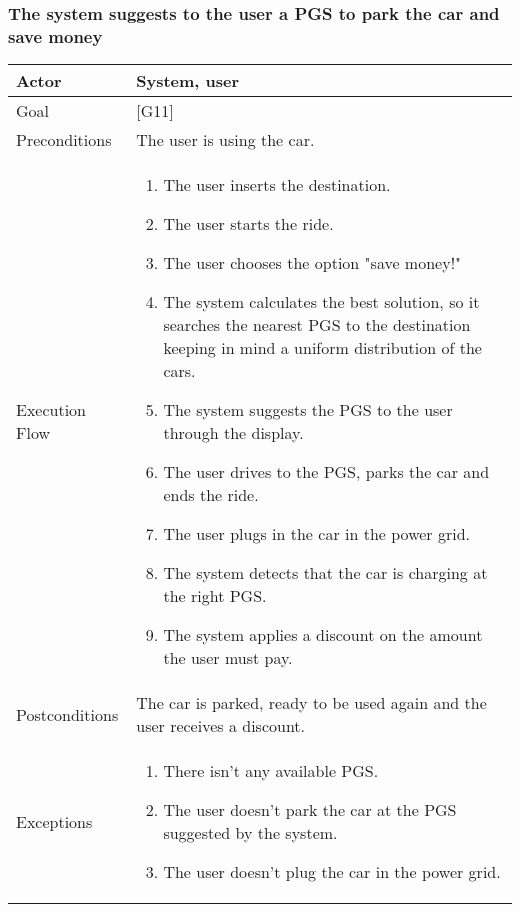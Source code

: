 \documentclass{article}
\begin{document}
	\subsubsection{The system suggests to the user a PGS to park the car and save money}
	\begin{tabularx}{\textwidth}{  l  X  }
		\hline
		Actor & System, user\\
		\hline
		Goal & [G11]\\
		\hline
		Preconditions & The user is using the car.\\
		\hline
		Execution Flow & \begin{enumerate}
			\item{The user inserts the destination.}
                     \item{The user starts the ride.}
                     \item{The user chooses the option "save money!"}
										 \item{The system calculates the best solution, so it searches the nearest PGS to the destination keeping in mind a uniform distribution of the cars.}
										 \item{The system suggests the PGS to the user through the display.}
										 \item{The user drives to the PGS, parks the car and ends the ride.}
										 \item{The user plugs in the car in the power grid.}
										 \item{The system detects that the car is charging at the right PGS.}
										 \item{The system applies a discount on the amount the user must pay.}
										\end{enumerate}\\
		\hline
		Postconditions & The car is parked, ready to be used again and the user receives a discount.\\
		\hline
		Exceptions & \begin{enumerate}
				\item{There isn't any available PGS.}
				\item{The user doesn't park the car at the PGS suggested by the system.}
				\item{The user doesn't plug the car in the power grid.}
	\end{enumerate}\\
		\hline
	\end{tabularx}
\end{document}
